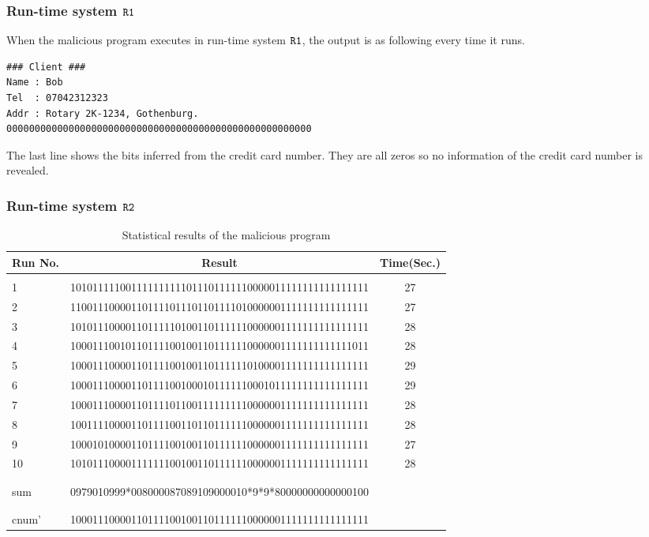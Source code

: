 \documentclass{report}
\newcommand{\co}[1]{$\cod{#1}$}
\begin{document}
\subsubsection{Run-time system \co{R1}}
When the malicious program executes in run-time system \co{R1}, the output is as following every
time it runs.
\begin{Verbatim}[fontsize=\small]
### Client ###
Name : Bob
Tel  : 07042312323
Addr : Rotary 2K-1234, Gothenburg.
000000000000000000000000000000000000000000000000000000
\end{Verbatim}
The last line shows the bits inferred from the credit card number. They are all zeros so no information of
the credit card number is revealed.

\subsubsection{Run-time system \co{R2}}

\begin{table}[t]
\centering
\begin{tabular}{lcc}
{\bf Run No}. & {\bf Result} & {\bf Time}({\bf Sec}.) \\ \hline \\
1  & 101011111001111111111011101111110000011111111111111111 & 27 \\
2  & 110011100001101111011101101111010000001111111111111111 & 27 \\
3  & 101011100001101111101001101111110000001111111111111111 & 28 \\ 
4  & 100011100101101111001001101111110000001111111111111011 & 28 \\
5  & 100011100001101111001001101111110100001111111111111111 & 29 \\
6  & 100011100001101111001000101111110001011111111111111111 & 29 \\
7  & 100011100001101111011001111111110000001111111111111111 & 28 \\
8  & 100111100001101111001101101111110000001111111111111111 & 28 \\
9  & 100010100001101111001001101111110000001111111111111111 & 27 \\
10 & 101011100001111111001001101111110000001111111111111111 & 28 \\
\\ \hline \\
sum   & 0979010999*008000087089109000010*9*9*80000000000000100 &    \\
\\ \hline \\
cnum' & 100011100001101111001001101111110000001111111111111111 & \\
\end{tabular}
\caption{Statistical results of the malicious program}
\label{table:chap8:shopping}
\end{table}
\end{document}
